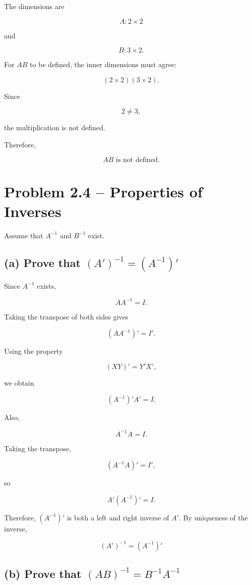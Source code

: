 \documentclass[12pt]{article}
\begin{document}
The dimensions are

\[
A:2\times2
\]

and

\[
B:3\times2.
\]

For $AB$ to be defined, the inner dimensions must agree:

\[
(2\times\boxed{2})(\boxed{3}\times2).
\]

Since

\[
2\neq3,
\]

the multiplication is not defined.

Therefore,

\[
\boxed{\text{$AB$ is not defined.}}
\]

\section*{Problem 2.4 -- Properties of Inverses}

Assume that $A^{-1}$ and $B^{-1}$ exist.

\subsection*{(a) Prove that $(A')^{-1}=(A^{-1})'$}

Since $A^{-1}$ exists,

\[
AA^{-1}=I.
\]

Taking the transpose of both sides gives

\[
(AA^{-1})'=I'.
\]

Using the property

\[
(XY)'=Y'X',
\]

we obtain

\[
(A^{-1})'A'=I.
\]

Also,

\[
A^{-1}A=I.
\]

Taking the transpose,

\[
(A^{-1}A)'=I',
\]

so

\[
A'(A^{-1})'=I.
\]

Therefore, $(A^{-1})'$ is both a left and right inverse of $A'$.
By uniqueness of the inverse,

\[
\boxed{
(A')^{-1}=(A^{-1})'
}
\]

\subsection*{(b) Prove that $(AB)^{-1}=B^{-1}A^{-1}$}
\end{document}

